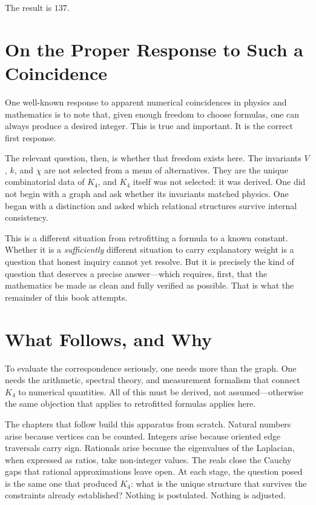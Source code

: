 \documentclass[11pt,a4paper]{book}
\begin{document}
The result is $137$.

\section{On the Proper Response to Such a Coincidence}

One well-known response to apparent numerical coincidences in physics and
mathematics is to note that, given enough freedom to choose formulas, one can
always produce a desired integer. This is true and important. It is the correct
first response.

The relevant question, then, is whether that freedom exists here. The invariants
$V$, $k$, and $\chi$ are not selected from a menu of alternatives. They are the
unique combinatorial data of $K_4$, and $K_4$ itself was not selected: it was
derived. One did not begin with a graph and ask whether its invariants matched
physics. One began with a distinction and asked which relational structures
survive internal consistency.

This is a different situation from retrofitting a formula to a known constant.
Whether it is a \emph{sufficiently} different situation to carry explanatory
weight is a question that honest inquiry cannot yet resolve. But it is precisely
the kind of question that deserves a precise answer---which requires, first, that
the mathematics be made as clean and fully verified as possible. That is what the
remainder of this book attempts.

\section{What Follows, and Why}

To evaluate the correspondence seriously, one needs more than the graph. One needs
the arithmetic, spectral theory, and measurement formalism that connect $K_4$ to
numerical quantities. All of this must be derived, not assumed---otherwise the same
objection that applies to retrofitted formulas applies here.

The chapters that follow build this apparatus from scratch. Natural numbers arise
because vertices can be counted. Integers arise because oriented edge traversals
carry sign. Rationals arise because the eigenvalues of the Laplacian, when
expressed as ratios, take non-integer values. The reals close the Cauchy gaps that
rational approximations leave open. At each stage, the question posed is the same
one that produced $K_4$: what is the unique structure that survives the constraints
already established? Nothing is postulated. Nothing is adjusted.
\end{document}
